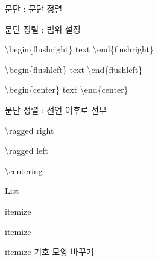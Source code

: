 \documentclass[ aspectratio=149,  14pt,blue,xcolor=pdftex,dvipsnames,table,handout,notes]{beamer}
\begin{document}
		\begin{frame}[t]{문단 : 문단 정렬}

			\begin{block} {문단 정렬 :  범위 설정}
			\begin{description}[123456789012345]
			\item [오른쪽 정렬]	\textbackslash begin\{flushright\} text \textbackslash  end\{flushright\}
			\item [왼쪽 정렬]		\textbackslash begin\{flushleft\} text \textbackslash  end\{flushleft\}
			\item [가운데 정렬]	\textbackslash begin\{center\} text \textbackslash  end\{center\}
			\end{description}
			\end{block}

			\begin{block} {문단 정렬 : 선언 이후로 전부}
			\begin{description}[123456789012345]
			\item [오른쪽 정렬]	\textbackslash ragged right
			\item [왼쪽 정렬]		\textbackslash ragged left
			\item [가운데 정렬]	\textbackslash centering
			\end{description}
			\end{block}

		
		\end{frame}







		\begin{frame}[t]{List}

		
		\end{frame}


		\begin{frame}[t]{itemize}

			\begin{block}{itemize}
			\end{block}

			\begin{block}{itemize 기호 모양 바꾸기}
			\end{block}



		\end{frame}
\end{document}
